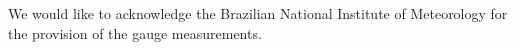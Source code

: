 \documentclass[journal abbreviation, manuscript]{copernicus}
\begin{document}
\begin{acknowledgements}
  We would like to acknowledge the Brazilian National Institute of Meteorology
  for the provision of the gauge measurements.
\end{acknowledgements}

















\end{document}
